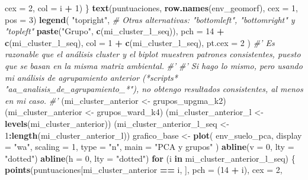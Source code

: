 \documentclass[11pt,]{article}
\newenvironment{Shaded}{\begin{snugshade}}{\end{snugshade}}
\newcommand{\KeywordTok}[1]{\textcolor[rgb]{0.13,0.29,0.53}{\textbf{#1}}}
\newcommand{\DataTypeTok}[1]{\textcolor[rgb]{0.13,0.29,0.53}{#1}}
\newcommand{\DecValTok}[1]{\textcolor[rgb]{0.00,0.00,0.81}{#1}}
\newcommand{\StringTok}[1]{\textcolor[rgb]{0.31,0.60,0.02}{#1}}
\newcommand{\CommentTok}[1]{\textcolor[rgb]{0.56,0.35,0.01}{\textit{#1}}}
\newcommand{\ControlFlowTok}[1]{\textcolor[rgb]{0.13,0.29,0.53}{\textbf{#1}}}
\newcommand{\OperatorTok}[1]{\textcolor[rgb]{0.81,0.36,0.00}{\textbf{#1}}}
\newcommand{\NormalTok}[1]{#1}
\begin{document}
\begin{Shaded}
\begin{Highlighting}[]
{{{{{{{{         \DataTypeTok{cex =} \DecValTok{2}\NormalTok{,}
         \DataTypeTok{col =}\NormalTok{ i }\OperatorTok{+}\StringTok{ }\DecValTok{1}\NormalTok{)}
\NormalTok{\}}
\KeywordTok{text}\NormalTok{(puntuaciones, }\KeywordTok{row.names}\NormalTok{(env_geomorf), }\DataTypeTok{cex =} \DecValTok{1}\NormalTok{, }\DataTypeTok{pos =} \DecValTok{3}\NormalTok{)}
\KeywordTok{legend}\NormalTok{(}
  \StringTok{"topright"}\NormalTok{, }\CommentTok{# Otras alternativas: "bottomleft", "bottomright" y "topleft"}
  \KeywordTok{paste}\NormalTok{(}\StringTok{"Grupo"}\NormalTok{, }\KeywordTok{c}\NormalTok{(mi_cluster_l_seq)),}
  \DataTypeTok{pch =} \DecValTok{14} \OperatorTok{+}\StringTok{ }\KeywordTok{c}\NormalTok{(mi_cluster_l_seq),}
  \DataTypeTok{col =} \DecValTok{1} \OperatorTok{+}\StringTok{ }\KeywordTok{c}\NormalTok{(mi_cluster_l_seq),}
  \DataTypeTok{pt.cex =} \DecValTok{2}
\NormalTok{)}
\CommentTok{#' Es razonable que el análisis cluster y el biplot muestren patrones consistentes, puesto que se basan en la misma matriz ambiental.}
\CommentTok{#' }
\CommentTok{#' Si hago lo mismo, pero usando mi análisis de agrupamiento anterior (*scripts* "aa_analisis_de_agrupamiento_*"), no obtengo resultados consistentes, al menos en mi caso.}
\CommentTok{#' }
\NormalTok{(mi_cluster_anterior <-}\StringTok{ }\NormalTok{grupos_upgma_k2)}
\NormalTok{(mi_cluster_anterior <-}\StringTok{ }\NormalTok{grupos_ward_k4)}
\NormalTok{(mi_cluster_anterior_l <-}\StringTok{ }\KeywordTok{levels}\NormalTok{(mi_cluster_anterior))}
\NormalTok{(mi_cluster_anterior_l_seq <-}\StringTok{ }\DecValTok{1}\OperatorTok{:}\KeywordTok{length}\NormalTok{(mi_cluster_anterior_l))}
\NormalTok{grafico_base <-}\StringTok{ }\KeywordTok{plot}\NormalTok{(}
\NormalTok{  env_suelo_pca,}
  \DataTypeTok{display =} \StringTok{"wa"}\NormalTok{,}
  \DataTypeTok{scaling =} \DecValTok{1}\NormalTok{,}
  \DataTypeTok{type =} \StringTok{"n"}\NormalTok{,}
  \DataTypeTok{main =} \StringTok{"PCA y grupos"}
\NormalTok{)}
\KeywordTok{abline}\NormalTok{(}\DataTypeTok{v =} \DecValTok{0}\NormalTok{, }\DataTypeTok{lty =} \StringTok{"dotted"}\NormalTok{)}
\KeywordTok{abline}\NormalTok{(}\DataTypeTok{h =} \DecValTok{0}\NormalTok{, }\DataTypeTok{lty =} \StringTok{"dotted"}\NormalTok{)}
\ControlFlowTok{for}\NormalTok{ (i }\ControlFlowTok{in}\NormalTok{ mi_cluster_anterior_l_seq) \{}
  \KeywordTok{points}\NormalTok{(puntuaciones[mi_cluster_anterior }\OperatorTok{==}\StringTok{ }\NormalTok{i, ],}
         \DataTypeTok{pch =}\NormalTok{ (}\DecValTok{14} \OperatorTok{+}\StringTok{ }\NormalTok{i),}
         \DataTypeTok{cex =} \DecValTok{2}\NormalTok{,}
}}}}}}}}
\end{Highlighting}
\end{Shaded}
\end{document}
